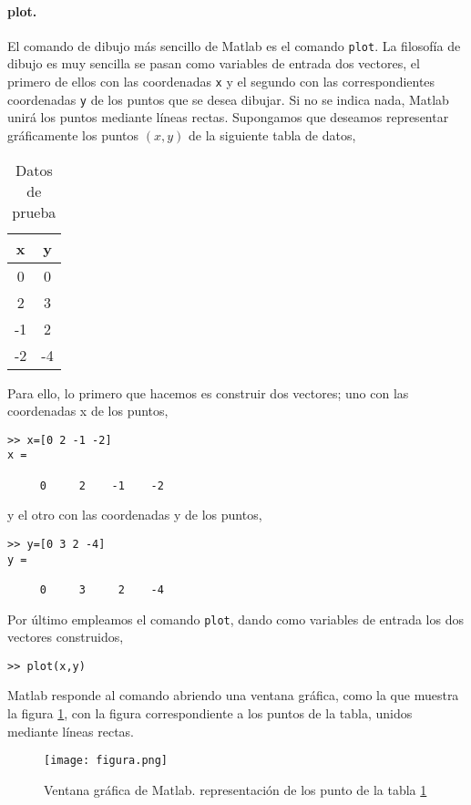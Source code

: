 \paragraph{plot.} El comando de dibujo más sencillo de Matlab es el comando \texttt{plot}. La filosofía de dibujo es muy sencilla se pasan como variables de entrada dos vectores, el primero de ellos con las coordenadas \texttt{x} y el segundo con las correspondientes coordenadas \texttt{y} de los puntos que se desea dibujar. Si no se indica nada, Matlab unirá los puntos mediante líneas rectas. Supongamos que deseamos representar gráficamente los puntos $(x,y)$ de la siguiente tabla de datos,

\begin{table}[h]
\caption{Datos de prueba}
\centering
\begin{tabular}{|c|c|}
x&y\\ 
\hline
0&0\\
2&3\\
-1&2\\
-2&-4\\ 
\end{tabular}
\label{tpuntos}
\end{table} 

Para ello, lo primero que hacemos es construir dos vectores; uno con las coordenadas x de los puntos,
\begin{verbatim}
>> x=[0 2 -1 -2]
x =

     0     2    -1    -2

\end{verbatim}
y el otro con las coordenadas y de los puntos,
\begin{verbatim}
>> y=[0 3 2 -4]
y =

     0     3     2    -4
\end{verbatim}
 
Por último empleamos el comando \texttt{plot}, dando como variables de entrada los dos vectores construidos,
 
\begin{verbatim}
>> plot(x,y)
\end{verbatim}

Matlab responde al comando abriendo una ventana gráfica, como la que muestra la figura \ref{fig:ventana}, con la figura correspondiente a los puntos de la tabla, unidos mediante líneas rectas.

\begin{figure}[h]
\centering
\texttt{[image: figura.png]}
\caption{Ventana gráfica de Matlab. representación de los punto de la tabla \ref{tpuntos}}
\label{fig:ventana}
\end{figure}

